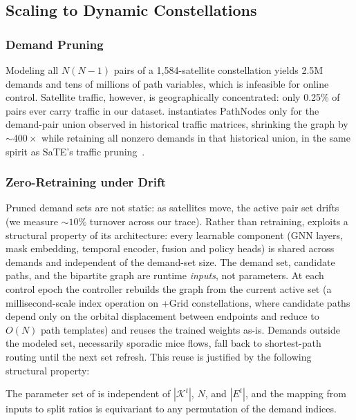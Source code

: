 \subsection{Scaling to Dynamic Constellations}
\label{sec:scaling}

\subsubsection{Demand Pruning}
Modeling all $N(N-1)$ pairs of a 1,584-satellite constellation yields 2.5M
demands and tens of millions of path variables, which is infeasible for
online control. Satellite traffic, however, is geographically concentrated: only
0.25\% of pairs ever carry traffic in our dataset. \sysname{} instantiates
PathNodes only for the demand-pair union observed in historical traffic
matrices, shrinking the graph by ${\sim}400\times$ while retaining all
nonzero demands in that historical union, in the same spirit as SaTE's
traffic pruning~\cite{sate}.

\subsubsection{Zero-Retraining under Drift}
Pruned demand sets are not static: as satellites move, the active pair set
drifts (we measure ${\sim}10\%$ turnover across our
trace). Rather than retraining, \sysname{} exploits a structural
property of its architecture: every learnable component (GNN layers, mask
embedding, temporal encoder, fusion and policy heads) is shared across
demands and independent of the demand-set size. The demand set, candidate
paths, and the bipartite graph are runtime \emph{inputs}, not parameters. At
each control epoch the controller rebuilds the graph from the current active
set (a millisecond-scale index operation on +Grid constellations, where
candidate paths depend only on the orbital displacement between endpoints
and reduce to $O(N)$ path templates) and reuses the trained weights
as-is. Demands outside the modeled set, necessarily sporadic mice flows,
fall back to shortest-path routing until the next set refresh.
This reuse is justified by the following structural property:

\begin{proposition}
\label{prop:invariance}
The parameter set of \sysname{} is independent of $|\mathcal{K}^t|$, $N$,
and $|E^t|$, and the mapping from inputs to split ratios is equivariant to
any permutation of the demand indices.
\end{proposition}

